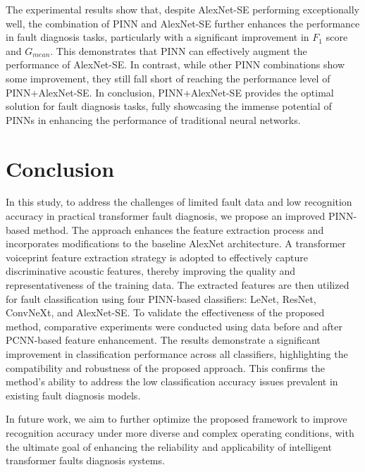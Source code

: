 \documentclass[final,5p,times,twocolumn]{elsarticle}
\begin{document}
The experimental results show that, despite AlexNet-SE performing exceptionally well, the combination of PINN and AlexNet-SE further enhances the performance in fault diagnosis tasks, particularly with a significant improvement in $F_1$ score and \(G_{mean}\). This demonstrates that PINN can effectively augment the performance of AlexNet-SE. In contrast, while other PINN combinations show some improvement, they still fall short of reaching the performance level of PINN+AlexNet-SE. In conclusion, PINN+AlexNet-SE provides the optimal solution for fault diagnosis tasks, fully showcasing the immense potential of PINNs in enhancing the performance of traditional neural networks.


\section{Conclusion}
In this study, to address the challenges of limited fault data and low recognition accuracy in practical transformer fault diagnosis, we propose an improved PINN-based method. The approach enhances the feature extraction process and incorporates modifications to the baseline AlexNet architecture. A transformer voiceprint feature extraction strategy is adopted to effectively capture discriminative acoustic features, thereby improving the quality and representativeness of the training data. The extracted features are then utilized for fault classification using four PINN-based classifiers: LeNet, ResNet, ConvNeXt, and AlexNet-SE. To validate the effectiveness of the proposed method, comparative experiments were conducted using data before and after PCNN-based feature enhancement. The results demonstrate a significant improvement in classification performance across all classifiers, highlighting the compatibility and robustness of the proposed approach. This confirms the method’s ability to address the low classification accuracy issues prevalent in existing fault diagnosis models.

In future work, we aim to further optimize the proposed framework to improve recognition accuracy under more diverse and complex operating conditions, with the ultimate goal of enhancing the reliability and applicability of intelligent transformer faults diagnosis systems.


   
  
\end{document}

